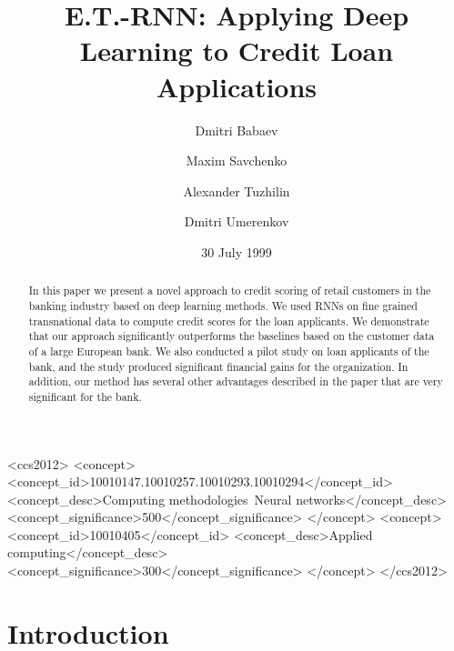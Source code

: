 \documentclass[sigconf]{acmart}
\begin{document}
\title{E.T.-RNN: Applying Deep Learning to Credit Loan Applications}


\author{Dmitri Babaev}

\author{Maxim Savchenko}

\author{Alexander Tuzhilin}

\author{Dmitri Umerenkov}

\date{30 July 1999}

\begin{abstract}
In this paper we present a novel approach to credit scoring of retail customers in the banking industry based on deep learning methods. We used RNNs on fine grained transnational data to compute credit scores for the loan applicants. We demonstrate that our approach significantly outperforms the baselines based on the customer data of a large European bank. We also conducted a pilot study on loan applicants of the bank, and the study produced significant financial gains for the organization.
In addition, our method has several other advantages described in the paper that are very significant for the bank.
\end{abstract}

\begin{CCSXML}
<ccs2012>
<concept>
<concept_id>10010147.10010257.10010293.10010294</concept_id>
<concept_desc>Computing methodologies~Neural networks</concept_desc>
<concept_significance>500</concept_significance>
</concept>
<concept>
<concept_id>10010405</concept_id>
<concept_desc>Applied computing</concept_desc>
<concept_significance>300</concept_significance>
</concept>
</ccs2012>
\end{CCSXML}



\maketitle

\section{Introduction}
\end{document}
